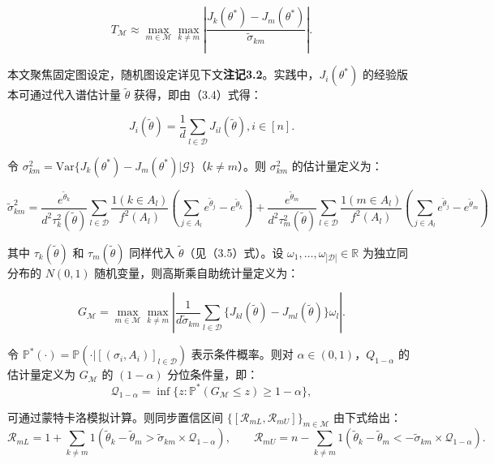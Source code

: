 \[
T_{\mathcal{M}}\approx \max_{m\in \mathcal{M}}\max_{k\neq m}\left|\frac{J_{k}(\theta^{*}) - J_{m}(\theta^{*})}{\widetilde{\sigma}_{km}}\right|. \tag{3.12}
\]

本文聚焦固定图设定，随机图设定详见下文\textbf{注记3.2}。实践中，$J_{i}(\theta^{*})$ 的经验版本可通过代入谱估计量 $\widetilde{\theta}$ 获得，即由（3.4）式得：

$$
J_{i}(\widetilde{\theta}) = \frac{1}{d}\sum_{l\in \mathcal{D}}J_{il}(\widetilde{\theta}), i\in [n].
$$

令 $\sigma_{km}^{2} = \mathrm{Var}\{J_{k}(\theta^{*}) - J_{m}(\theta^{*})|\mathcal{G}\}$（$k\neq m$）。则 $\sigma_{km}^{2}$ 的估计量定义为：

\[
\widetilde{\sigma}_{km}^{2} = \frac{e^{\widetilde{\theta}_{k}}}{d^{2}\tau_{k}^{2}(\widetilde{\theta})}\sum_{l\in \mathcal{D}}\frac{1(k\in A_{l})}{f^{2}(A_{l})}\left(\sum_{j\in A_{l}}e^{\widetilde{\theta}_{j}} - e^{\widetilde{\theta}_{k}}\right) + \frac{e^{\widetilde{\theta}_{m}}}{d^{2}\tau_{m}^{2}(\widetilde{\theta})}\sum_{l\in \mathcal{D}}\frac{1(m\in A_{l})}{f^{2}(A_{l})}\left(\sum_{j\in A_{l}}e^{\widetilde{\theta}_{j}} - e^{\widetilde{\theta}_{m}}\right) \tag{3.13}
\]

其中 $\tau_{k}(\widetilde{\theta})$ 和 $\tau_{m}(\widetilde{\theta})$ 同样代入 $\widetilde{\theta}$（见（3.5）式）。设 $\omega_{1},\ldots ,\omega_{|\mathcal{D}|}\in \mathbb{R}$ 为独立同分布的 $N(0,1)$ 随机变量，则高斯乘自助统计量定义为：

\[
G_{\mathcal{M}} = \max_{m\in \mathcal{M}}\max_{k\neq m}\left|\frac{1}{d\widetilde{\sigma}_{km}}\sum_{l\in \mathcal{D}}\{J_{kl}(\widetilde{\theta}) - J_{ml}(\widetilde{\theta})\} \omega_{l}\right|. \tag{3.14}
\]

令 $\mathbb{P}^{*}(\cdot) = \mathbb{P}(\cdot | [(\sigma_{i},A_{i})]_{l\in \mathcal{D}})$ 表示条件概率。则对 $\alpha \in (0,1)$，$Q_{1 - \alpha}$ 的估计量定义为 $G_{\mathcal{M}}$ 的 $(1 - \alpha)$ 分位条件量，即：
$$
\mathcal{Q}_{1 - \alpha} = \inf \{z:\mathbb{P}^{*}(G_{\mathcal{M}}\leq z)\geq 1 - \alpha \} ,
$$

可通过蒙特卡洛模拟计算。则同步置信区间 $\{[\mathcal{R}_{mL},\mathcal{R}_{mU}]\}_{m\in \mathcal{M}}$ 由下式给出：
\[
\mathcal{R}_{mL} = 1 + \sum_{k\neq m}1\left(\widetilde{\theta}_{k} - \widetilde{\theta}_{m} > \widetilde{\sigma}_{km}\times \mathcal{Q}_{1 - \alpha}\right),\qquad \mathcal{R}_{mU} = n - \sum_{k\neq m}1\left(\widetilde{\theta}_{k} - \widetilde{\theta}_{m}< -\widetilde{\sigma}_{km}\times \mathcal{Q}_{1 - \alpha}\right). \tag{3.15}
\]

